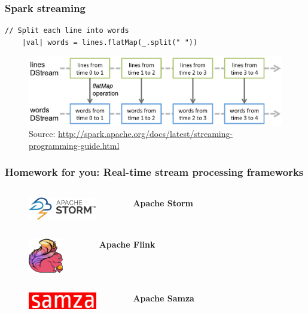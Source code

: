 \documentclass[10pt,utf8]{beamer}
\begin{document}
\begin{frame}[fragile]
	\frametitle{Spark streaming}
	\begin{lstlisting}[style=Java]
    // Split each line into words
    |val| words = lines.flatMap(_.split(" "))
	\end{lstlisting}

	\begin{figure}
		\centering
		\includegraphics[width=12cm]{./img/streaming-dstream-ops.eps}
		\caption{\tiny{Source: \url{http://spark.apache.org/docs/latest/streaming-programming-guide.html}}}
	\end{figure}
\end{frame}


\begin{frame}
	\frametitle{Homework for you: Real-time stream processing frameworks}
	\begin{columns}
		\begin{figure}
			\centering
			\includegraphics[width=3cm]{./img/storm-logo.eps}
		\end{figure}
		\vspace{-0.5cm}
		\textbf{\Large{Apache Storm}} 
	\end{columns}

	\vspace{1cm}
	
	\begin{columns}
	\column{0.45\textwidth}
		\begin{figure}
			\centering
			\includegraphics[width=1.5cm]{./img/flink-logo.eps}
		\end{figure}
	\column{0.55\textwidth}
		\vspace{-0.5cm}
		\textbf{\Large{Apache Flink}}
	\end{columns}
	
	\vspace{1cm}
	
	\begin{columns}
		\begin{figure}
			\centering
			\includegraphics[width=3cm]{./img/samza.eps}
		\end{figure}
		\vspace{-0.5cm}
		\textbf{\Large{Apache Samza}}
	\end{columns}
\end{frame}
\end{document}
